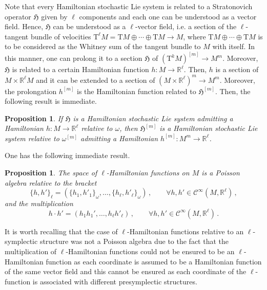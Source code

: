 \documentclass[11pt]{article}
\theoremstyle{plain}
\newtheorem{proposition}[theorem]{Proposition}
\theoremstyle{definition}
\newcommand{\Cinfty}{\mathscr{C}^\infty}
\newcommand{\T}{\mathrm{T}}
\begin{document}
Note that every Hamiltonian stochastic Lie system is related to a Stratonovich operator $\mathfrak{H}$ given by $\ell$ components and each one can be understood as a vector field. Hence, $\mathfrak{H}$ can be understood as a $\ell$-vector field, i.e. a section of the $\ell$-tangent bundle of velocities $\T^\ell M=\T M\oplus \dotsb \oplus \T M\rightarrow M$, where $\T M\oplus\dotsb\oplus \T M$ is to be considered as the Whitney sum of the tangent bundle to $M$ with itself. In this manner, one can prolong it to a section $\mathfrak{H}$ of $(\T^kM)^{[m]}\rightarrow M^m$. 
Moreover, $\mathfrak{H}$ is related to a certain Hamiltonian function $h:M\rightarrow \mathbb{R}^\ell$. Then, $h$ is a section of $M\times \mathbb{R}^\ell M$ and it can be extended to a section of $(M\times \mathbb{R}^\ell)^m\rightarrow M^m$. Moreover, the prolongation $h^{[m]}$ is the Hamiltonian function related to $\mathfrak{H}^{[m]}$.  Then, the following result is immediate.

\begin{proposition}\label{Cor:LieAlgJL2}
    If $\mathfrak{H}$ is a Hamiltonian stochastic Lie system admitting a Hamiltonian $h:M\rightarrow \mathbb{R}^\ell$ relative to $\omega$, then $\mathfrak{H}^{[m]}$ is a Hamiltonian stochastic Lie system relative to $\omega^{[m]}$ admitting a Hamiltonian $h^{[m]}:M^m\rightarrow \mathbb{R}^\ell$.
\end{proposition}

One has the following immediate result.
\begin{proposition} The space of $\ell$-Hamiltonian functions on $M$ is a Poisson algebra relative to the bracket
$$
\{h,h'\}_\ell=(\{h_1,h'_1\}_\omega,\ldots,\{h_\ell,h'_\ell\}_\omega)\,, \qquad \forall h,h'\in \Cinfty(M,\mathbb{R}^\ell)\,,
$$
and the multiplication
$$
h\cdot h'=(h_1h_1',\ldots,h_\ell h'_\ell)\,,\qquad 
\forall h,h'\in \Cinfty(M,\mathbb{R}^\ell)\,.
$$
\end{proposition}
It is worth recalling that the case of $\ell$-Hamiltonian functions relative to an $\ell$-symplectic structure was not a Poisson algebra due to the fact that the multiplication of $\ell$-Hamiltonian functions could not be ensured to be an $\ell$-Hamiltonian function as each coordinate is assumed to be a Hamiltonian function of the same vector field and this cannot be ensured as each coordinate of the $\ell$-function is associated with different presymplectic structures.

\end{document}
